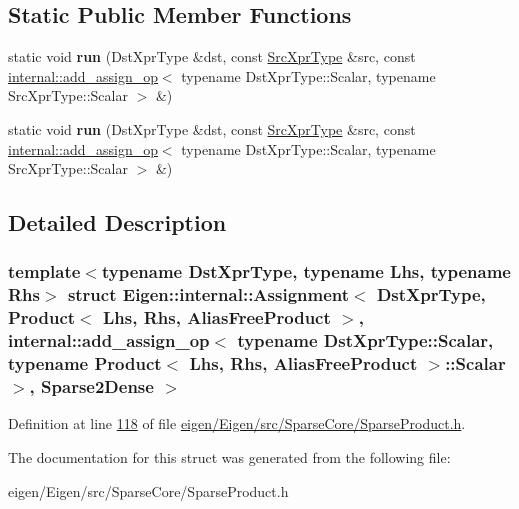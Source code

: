 \subsection*{Static Public Member Functions}
\begin{DoxyCompactItemize}
\item 
\mbox{\label{struct_eigen_1_1internal_1_1_assignment_3_01_dst_xpr_type_00_01_product_3_01_lhs_00_01_rhs_00_01829d7a1a901a0be4e54bdeda694d8781_a05b9d6144b178e559b94eed1a84adf5e}} 
static void {\bfseries run} (Dst\+Xpr\+Type \&dst, const \hyperlink{group___core___module_class_eigen_1_1_product}{Src\+Xpr\+Type} \&src, const \hyperlink{struct_eigen_1_1internal_1_1add__assign__op}{internal\+::add\+\_\+assign\+\_\+op}$<$ typename Dst\+Xpr\+Type\+::\+Scalar, typename Src\+Xpr\+Type\+::\+Scalar $>$ \&)
\item 
\mbox{\label{struct_eigen_1_1internal_1_1_assignment_3_01_dst_xpr_type_00_01_product_3_01_lhs_00_01_rhs_00_01829d7a1a901a0be4e54bdeda694d8781_a05b9d6144b178e559b94eed1a84adf5e}} 
static void {\bfseries run} (Dst\+Xpr\+Type \&dst, const \hyperlink{group___core___module_class_eigen_1_1_product}{Src\+Xpr\+Type} \&src, const \hyperlink{struct_eigen_1_1internal_1_1add__assign__op}{internal\+::add\+\_\+assign\+\_\+op}$<$ typename Dst\+Xpr\+Type\+::\+Scalar, typename Src\+Xpr\+Type\+::\+Scalar $>$ \&)
\end{DoxyCompactItemize}


\subsection{Detailed Description}
\subsubsection*{template$<$typename Dst\+Xpr\+Type, typename Lhs, typename Rhs$>$\newline
struct Eigen\+::internal\+::\+Assignment$<$ Dst\+Xpr\+Type, Product$<$ Lhs, Rhs, Alias\+Free\+Product $>$, internal\+::add\+\_\+assign\+\_\+op$<$ typename Dst\+Xpr\+Type\+::\+Scalar, typename Product$<$ Lhs, Rhs, Alias\+Free\+Product $>$\+::\+Scalar $>$, Sparse2\+Dense $>$}



Definition at line \hyperlink{eigen_2_eigen_2src_2_sparse_core_2_sparse_product_8h_source_l00118}{118} of file \hyperlink{eigen_2_eigen_2src_2_sparse_core_2_sparse_product_8h_source}{eigen/\+Eigen/src/\+Sparse\+Core/\+Sparse\+Product.\+h}.



The documentation for this struct was generated from the following file\+:\begin{DoxyCompactItemize}
\item 
eigen/\+Eigen/src/\+Sparse\+Core/\+Sparse\+Product.\+h\end{DoxyCompactItemize}
